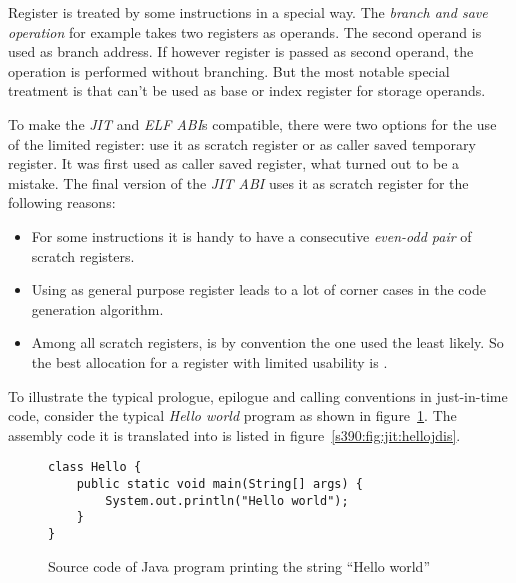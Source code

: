 Register  is treated by some instructions in a special way. The \emph{branch and save operation} for example takes two registers as operands. The second operand is used as branch address. If however register  is passed as second operand, the operation is performed without branching. But the most notable special treatment is that  can't be used as base or index register for storage operands. 

To make the \emph{JIT} and \emph{ELF ABI}s compatible, there were two options for the use of the limited  register: use it as scratch register or as caller saved temporary register. It was first used as caller saved register, what turned out to be a mistake. The final version of the \emph{JIT ABI} uses it as scratch register for the following reasons:

\begin{itemize}
	\item For some instructions it is handy to have a consecutive \emph{even-odd pair} of scratch registers.
	\item Using  as general purpose register leads to a lot of corner cases in the code generation algorithm.
	\item Among all scratch registers,  is by convention the one used the least likely. So the best allocation for a register with limited usability is .
\end{itemize}

To illustrate the typical prologue, epilogue and calling conventions in just-in-time code, consider the typical \emph{Hello world} program as shown in figure~\ref{s390:fig:jit:helloj}. The assembly code it is translated into is listed in figure~\ref{s390:fig:jit:hellojdis}.

\begin{figure}
\begin{verbatim}
class Hello {
    public static void main(String[] args) {
        System.out.println("Hello world");
    }
}    
\end{verbatim}

\caption{Source code of Java program printing the string ``Hello world''}
\label{s390:fig:jit:helloj}
\end{figure}

